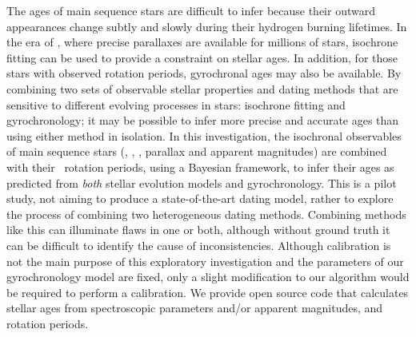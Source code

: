
The ages of main sequence stars are difficult to infer because their outward
appearances change subtly and slowly during their hydrogen burning lifetimes.
In the era of \gaia, where precise parallaxes are available for millions of
stars, isochrone fitting can be used to provide a constraint on stellar ages.
In addition, for those stars with observed rotation periods, gyrochronal ages
may also be available.
By combining two sets of observable stellar properties and dating methods that
are sensitive to different evolving processes in stars: isochrone fitting and
gyrochronology; it may be possible to infer more precise and accurate ages
than using either method in isolation.
In this investigation, the isochronal observables of main sequence stars
(\teff, \feh, \logg, parallax and apparent magnitudes) are combined with their
\kepler\ rotation periods, using a Bayesian framework, to infer their ages as
predicted from {\it both} stellar evolution models and gyrochronology.
This is a pilot study, not aiming to produce a state-of-the-art dating model,
rather to explore the process of combining two heterogeneous dating methods.
Combining methods like this can illuminate flaws in one or both, although
without ground truth it can be difficult to identify the cause of
inconsistencies.
Although calibration is not the main purpose of this exploratory investigation
and the parameters of our gyrochronology model are fixed, only a slight
modification to our algorithm would be required to perform a calibration.
We provide open source code that calculates stellar ages from spectroscopic
parameters and/or apparent magnitudes, and rotation periods.




